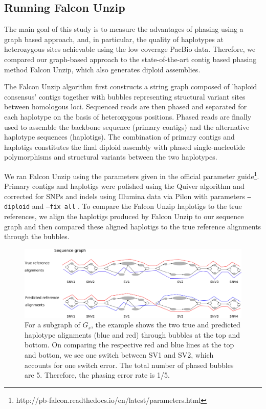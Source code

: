 \subsection{Running Falcon Unzip}
The main goal of this study is to measure the advantages of phasing using a graph based approach, 
and, in particular, the quality of haplotypes at heterozygous sites achievable using the low coverage PacBio data.
Therefore, we compared our graph-based approach to the state-of-the-art contig based phasing method Falcon Unzip, which also generates diploid assemblies.

The Falcon Unzip \citep{chin2016phased} algorithm first constructs a string graph composed of 'haploid consensus' contigs together with bubbles representing structural variant sites between homologous loci. 
Sequenced reads are then phased and separated for each haplotype on the basis of heterozygous positions. 
Phased reads are finally used to assemble the backbone sequence (primary contigs) and the alternative haplotype sequences (haplotigs). 
The combination of primary contigs and haplotigs constitutes the final diploid assembly with phased single-nucleotide polymorphisms and structural variants between the two haplotypes.

We ran Falcon Unzip using the parameters given in the official parameter guide\footnote{http://pb-falcon.readthedocs.io/en/latest/parameters.html}.
Primary contigs and haplotigs were polished using the Quiver algorithm and corrected for SNPs and indels using Illumina data via Pilon with parameters \texttt{--diploid} and \texttt{--fix all} \citep{walker2014pilon}.
To compare the Falcon Unzip haplotigs to the true references, we align the haplotigs produced by Falcon Unzip to our sequence graph and then 
compared these aligned haplotigs to the true reference alignments through the bubbles.

\begin{figure}[t!]\centering
\includegraphics[width=\columnwidth]{evaluation.pdf}
\caption{For a subgraph of $G_s$, the example shows the two true and predicted haplotype alignments (blue and red) through bubbles at the top and bottom. On comparing the respective red and blue lines at the top and botton, we see one switch between SV1 and SV2, which accounts for one switch error. 
The total number of phased bubbles are 5. Therefore, the phasing error rate is 1/5.}
\label{fig:evaluation}
\end{figure}

